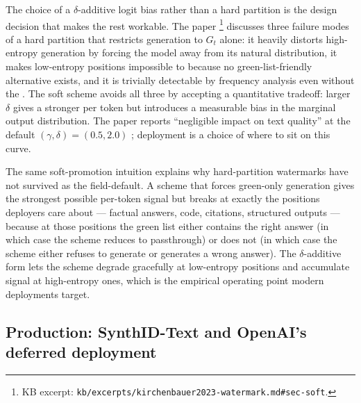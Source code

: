 The choice of a $\delta$-additive logit bias rather than a hard
partition is the design decision that makes the rest workable. The
paper%
\footnote{KB excerpt: \nolinkurl{kb/excerpts/kirchenbauer2023-watermark.md#sec-soft}.}
discusses three failure modes of a hard partition that restricts
generation to $G_t$ alone: it heavily distorts high-entropy
generation by forcing the model away from its natural distribution,
it makes low-entropy positions impossible to  because no
green-list-friendly alternative exists, and it is trivially detectable
by frequency analysis even without the . The soft scheme avoids
all three by accepting a quantitative tradeoff: larger $\delta$ gives
a stronger  per token but introduces a measurable bias in
the marginal output distribution. The paper reports
``negligible impact on text quality'' at the default
$(\gamma, \delta) = (0.5, 2.0)$
\citep[\S{}abstract]{kirchenbauer2023-watermark}; deployment is a
choice of where to sit on this curve.

The same soft-promotion intuition explains why hard-partition
watermarks have not survived as the field-default. A scheme that
forces green-only generation gives the strongest possible per-token
signal but breaks at exactly the positions deployers care about ---
factual answers, code, citations, structured outputs --- because at
those positions the green list either contains the right answer (in
which case the scheme reduces to passthrough) or does not (in which
case the scheme either refuses to generate or generates a wrong
answer). The $\delta$-additive form lets the scheme degrade
gracefully at low-entropy positions and accumulate signal at
high-entropy ones, which is the empirical operating point modern
deployments target.

\subsection{Production: SynthID-Text and OpenAI's deferred deployment}
\label{sec:watermarking-production}

